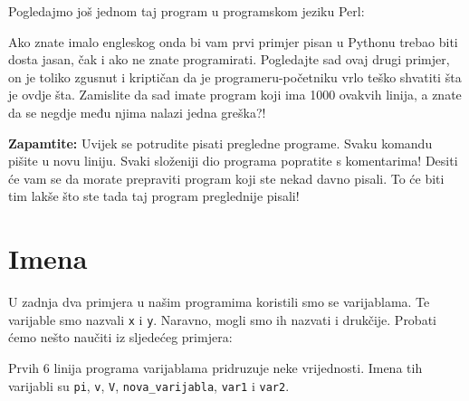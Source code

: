 	Pogledajmo još jednom taj program u programskom jeziku Perl:


	Ako znate imalo engleskog onda bi vam prvi primjer pisan u Pythonu trebao biti
	dosta jasan, čak i ako ne znate programirati. Pogledajte sad ovaj drugi
	primjer, on je toliko zgusnut i kriptičan da je programeru-početniku vrlo
	teško shvatiti šta je ovdje šta. Zamislite da sad imate program koji
	ima 1000 ovakvih linija, a znate da se negdje među njima nalazi jedna
	greška?!

	\textbf{Zapamtite:} Uvijek se potrudite pisati pregledne programe. Svaku komandu
	pišite u novu liniju. Svaki složeniji dio programa popratite s komentarima!
	Desiti će vam se da morate prepraviti program koji ste nekad davno pisali. To
	će biti tim lakše što ste tada taj program preglednije pisali!
	
\section{Imena}

	U zadnja dva primjera u našim programima koristili smo se varijablama. Te
	varijable smo nazvali \verb+x+ i \verb+y+. Naravno, mogli smo ih nazvati i
	drukčije. Probati ćemo nešto naučiti iz sljedećeg primjera:


	Prvih 6 linija programa varijablama pridruzuje neke vrijednosti. Imena tih
	varijabli su 
	\verb+pi+,
	\verb+v+,
	\verb+V+,
	\verb+nova_varijabla+,
	\verb+var1+ i 
	\verb+var2+.

